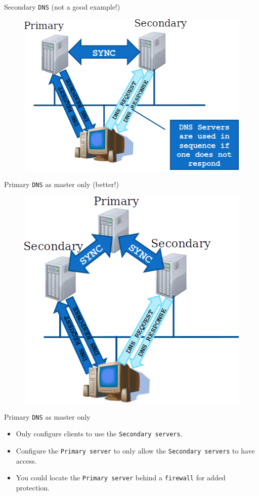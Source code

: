 \documentclass[aspectratio=169]{beamer}
\begin{document}
\begin{frame}{Secondary \texttt{DNS} (not a good example!)}
  \begin{figure}
    \begin{center}
      \includegraphics[width=0.6\linewidth]{secondarydns.png}
    \end{center}
  \end{figure}
\end{frame}

\begin{frame}{Primary \texttt{DNS} as master only (better!)}
  \begin{figure}
    \begin{center}
      \includegraphics[width=0.45\linewidth]{masteronlydns.png}
    \end{center}
  \end{figure}
\end{frame}

\begin{frame}{Primary \texttt{DNS} as master only}
  \begin{tcolorbox}[title={\textbf{SECURITY:}}]
    \begin{itemize}
      \item Only configure clients to use the \texttt{Secondary servers}.
      \item Configure the \texttt{Primary server} to only allow the \texttt{Secondary servers} to have access.
      \item You could locate the \texttt{Primary server} behind a \texttt{firewall} for added protection.  
    \end{itemize}
  \end{tcolorbox}
\end{frame}
\end{document}
